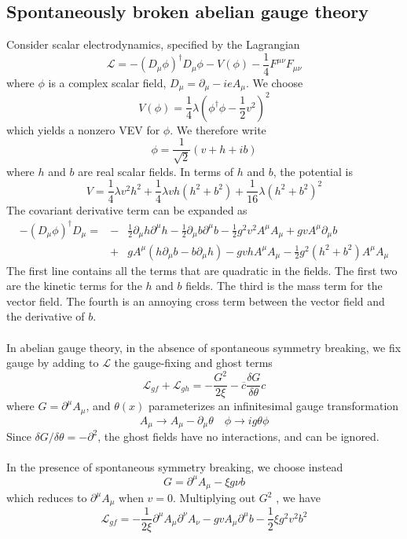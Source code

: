 \subsection{Spontaneously broken abelian gauge theory}
Consider scalar electrodynamics, specified by the Lagrangian
\[\mathcal{L} = -(D_{\mu}\phi)^{\dagger}D_{\mu}\phi - V(\phi) - \frac{1}{4}F^{\mu\nu}F_{\mu\nu}\]
where $\phi$ is a complex scalar field, $D_{\mu} = \partial_{\mu} - ieA_{\mu}$. We choose
\[V(\phi) = \frac{1}{4}\lambda (\phi^{\dagger}\phi - \frac{1}{2}v^2)^2\]
which yields a nonzero VEV for $\phi$. We therefore write
\[\phi = \frac{1}{\sqrt{2}}(v + h + ib)\]
where $h$ and $b$ are real scalar fields. In terms of $h$ and $b$, the potential is
\[V = \frac{1}{4}\lambda v^2 h^2 + \frac{1}{4}\lambda vh(h^2+b^2) + \frac{1}{16}\lambda (h^2+b^2)^2\]
The covariant derivative term can be expanded as
\begin{eqnarray}
-(D_{\mu}\phi)^{\dagger}D_{\mu} = &-& \frac{1}{2}\partial_{\mu}h \partial^{\mu}h -  \frac{1}{2}\partial_{\mu}b \partial^{\mu}b - \frac{1}{2} g^2v^2A^{\mu}A_{\mu} + gv A^{\mu}\partial_{\mu}b \nonumber \\
&+& gA^{\mu} (h\partial_{\mu}b - b\partial_{\mu}h) - gvhA^{\mu}A_{\mu} - \frac{1}{2}g^2(h^2+b^2)A^{\mu}A_{\mu} \nonumber
\end{eqnarray}
The first line contains all the terms that are quadratic in the fields. The first two are the kinetic terms for the $h$ and $b$ fields. The third is the mass term for the vector field. The fourth is an annoying cross term between the vector field and the derivative of $b$.
\\ \\
In abelian gauge theory, in the absence of spontaneous symmetry breaking, we fix gauge by adding to $\mathcal{L}$ the gauge-fixing and ghost terms
\[\mathcal{L}_{gf} + \mathcal{L}_{gh} = - \frac{G^2}{2\xi} - \overline{c}\frac{\delta G}{\delta \theta} c \]
where $G = \partial^{\mu}A_{\mu}$, and $\theta(x)$ parameterizes an infinitesimal gauge transformation
\[A_{\mu} \to A_{\mu} - \partial_{\mu}\theta \quad \phi \to ig\theta\phi\]
Since $\delta G / \delta \theta = - \partial^2$, the ghost fields have no interactions, and can be ignored.
\\ \\
In the presence of spontaneous symmetry breaking, we choose instead
\[G = \partial^{\mu}A_{\mu} - \xi g\nu b\]
which reduces to $\partial^{\mu}A_{\mu}$ when $v = 0$. Multiplying out $G^2$ , we have
\[\mathcal{L}_{gf} = -\frac{1}{2\xi} \partial^{\mu}A_{\mu} \partial^{\nu}A_{\nu} - gvA_{\mu}\partial^{\mu}b - \frac{1}{2}\xi g^2v^2b^2\]
